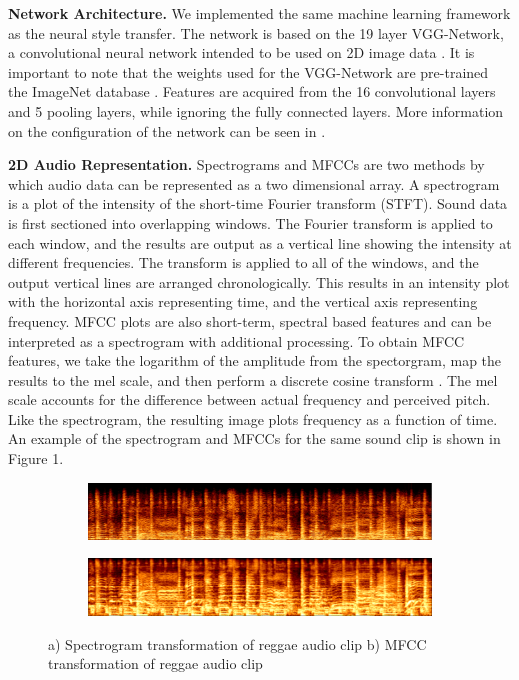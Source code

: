 \documentclass{article}
\begin{document}
\textbf{Network Architecture.} \hspace{0.25cm} We implemented the same machine learning framework as the neural style transfer. The network is based on the 19 layer VGG-Network, a convolutional neural network intended to be used on 2D image data \citep{Simonyan2014}. It is important to note that the weights used for the VGG-Network are pre-trained the ImageNet database \citep{Russ2014}. Features are acquired from the 16 convolutional layers and 5 pooling layers, while ignoring the fully connected layers. More information on the configuration of the network can be seen in \citep{Gatys2015}.

\textbf{2D Audio Representation.} \hspace{0.25cm} Spectrograms and MFCCs are two methods by which audio data can be represented as a two dimensional array. A spectrogram is a plot of the intensity of the short-time Fourier transform (STFT). Sound data is first sectioned into overlapping windows. The Fourier transform is applied to each window, and the results are output as a vertical line showing the intensity at different frequencies. The transform is applied to all of the windows, and the output vertical lines are arranged chronologically. This results in an intensity plot with the horizontal axis representing time, and the vertical axis representing frequency. MFCC plots are also short-term, spectral based features and can be interpreted as a spectrogram with additional processing. To obtain MFCC features, we take the logarithm of the amplitude from the spectorgram, map the results to the mel scale, and then perform a discrete cosine transform \citep{Logan2000}. The mel scale accounts for the difference between actual frequency and perceived pitch. Like the spectrogram, the resulting image plots frequency as a function of time. An example of the spectrogram and MFCCs for the same sound clip is shown in Figure 1.

\begin{figure}[h]
\begin{subfigure}{\textwidth}
  \centering
  \includegraphics[width = \textwidth]{spec_example}
  \caption{}
\end{subfigure}
 \begin{subfigure}{\textwidth}
  \centering
  \includegraphics[width = \textwidth]{mel_example}
  \caption{}
\end{subfigure}
\caption{a) Spectrogram transformation of reggae audio clip b) MFCC transformation of reggae audio clip}
\end{figure}
\end{document}
